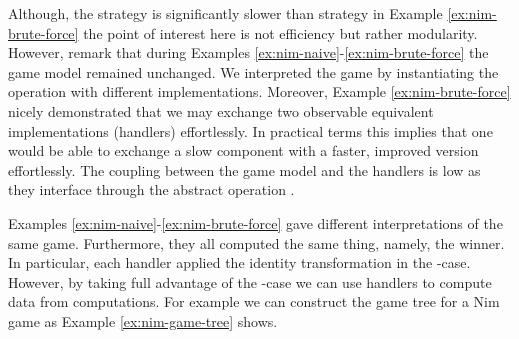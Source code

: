 Although, the  strategy is significantly slower than  strategy in Example \ref{ex:nim-brute-force} the point of interest here is not efficiency but rather modularity. However, remark that during Examples \ref{ex:nim-naive}-\ref{ex:nim-brute-force} the game model remained unchanged. We interpreted the game by instantiating the operation  with different implementations. 
Moreover, Example \ref{ex:nim-brute-force} nicely demonstrated that we may exchange two observable equivalent implementations (handlers) effortlessly. In practical terms this implies that one would be able to exchange a slow component with a faster, improved version effortlessly. The coupling between the game model and the handlers is low as they interface through the abstract operation .

Examples \ref{ex:nim-naive}-\ref{ex:nim-brute-force} gave different interpretations of the same game. Furthermore, they all computed the same thing, namely, the winner. In particular, each handler applied the identity transformation in the -case. However, by taking full advantage of the -case we can use handlers to compute data from computations. For example we can construct the game tree for a Nim game as Example \ref{ex:nim-game-tree} shows. 

